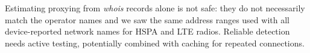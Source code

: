 \documentclass{sig-alternate-10pt}
\begin{document}
Estimating proxying from \emph{whois} records alone is not safe: they do not necessarily match the operator names and we saw the same address ranges used with all device-reported network names for HSPA and LTE radios. Reliable detection needs active testing, potentially combined with caching for repeated connections. 

\end{document}
